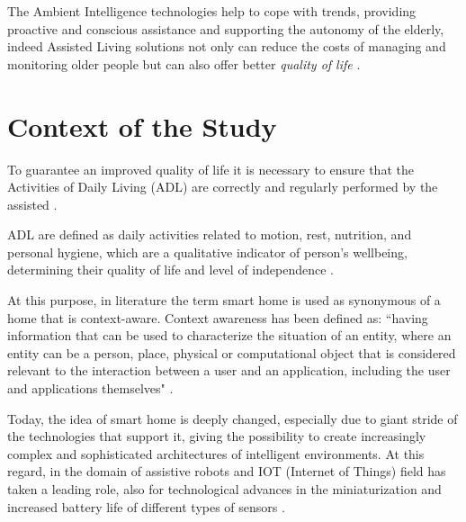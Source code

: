 \documentclass{thesisreport}
\begin{document}
 \parskip  \parskip
 
 The Ambient Intelligence technologies help to cope with trends, providing proactive and conscious assistance and supporting the autonomy of the elderly, indeed Assisted Living solutions not only can reduce the costs of managing and monitoring older people but can also offer better \textit{quality of life} \cite{kleinberger2007ambient}.
 
 \section{Context of the Study}
  To guarantee an improved quality of life it is necessary to ensure that the Activities of Daily Living (ADL) are correctly and regularly performed by the assisted \cite{buoncompagni2017towards}.
 
 ADL are defined as daily activities related to motion, rest, nutrition, and personal hygiene, which are a qualitative indicator of person’s wellbeing, determining their quality of life and level of independence \cite{buoncompagni2017towards}. 
 
 At this purpose, in literature the term smart home is used as synonymous of a home that is context-aware. Context awareness has been defined as: ``having information that can be used to characterize the situation of an entity, where an entity can be a person, place, physical or computational object that is considered relevant to the interaction between a user and an application, including the user and applications themselves" \cite{abowd1999towards}.  

 Today, the idea of smart home is deeply changed, especially due to giant stride of the technologies that support it, giving the possibility to create increasingly complex and sophisticated architectures of intelligent environments. At this regard, in the domain of assistive robots and IOT (Internet of Things) field has taken a leading role, also for technological advances in the miniaturization and increased battery life of different types of sensors \cite{phdthesis} \cite{nakashima2009handbook}.
 
\end{document}
